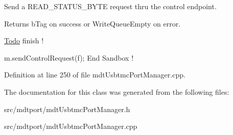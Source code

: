 Send a READ\_\-STATUS\_\-BYTE request thru the control endpoint. 

\begin{DoxyReturn}{Returns}
bTag on success or WriteQueueEmpty on error.
\end{DoxyReturn}
\begin{Desc}
\item[\hyperlink{todo__todo000055}{Todo}]finish ! \end{Desc}


m.sendControlRequest(f); End Sandbox ! 



Definition at line 250 of file mdtUsbtmcPortManager.cpp.



The documentation for this class was generated from the following files:\begin{DoxyCompactItemize}
\item 
src/mdtport/mdtUsbtmcPortManager.h\item 
src/mdtport/mdtUsbtmcPortManager.cpp\end{DoxyCompactItemize}
